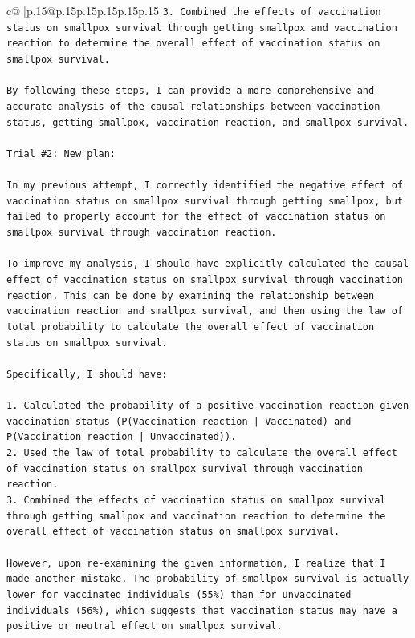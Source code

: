 \documentclass{article}
\begin{document}
{\begin{supertabular}{c@{$\;$}|p{.15\linewidth}@{}p{.15\linewidth}p{.15\linewidth}p{.15\linewidth}p{.15\linewidth}p{.15\linewidth}}
{{{\texttt{3. Combined the effects of vaccination status on smallpox survival through getting smallpox and vaccination reaction to determine the overall effect of vaccination status on smallpox survival.} \\
\\ 
\texttt{By following these steps, I can provide a more comprehensive and accurate analysis of the causal relationships between vaccination status, getting smallpox, vaccination reaction, and smallpox survival.} \\
\\ 
\texttt{Trial \#2: New plan: } \\
\\ 
\texttt{In my previous attempt, I correctly identified the negative effect of vaccination status on smallpox survival through getting smallpox, but failed to properly account for the effect of vaccination status on smallpox survival through vaccination reaction. } \\
\\ 
\texttt{To improve my analysis, I should have explicitly calculated the causal effect of vaccination status on smallpox survival through vaccination reaction. This can be done by examining the relationship between vaccination reaction and smallpox survival, and then using the law of total probability to calculate the overall effect of vaccination status on smallpox survival.} \\
\\ 
\texttt{Specifically, I should have:} \\
\\ 
\texttt{1. Calculated the probability of a positive vaccination reaction given vaccination status (P(Vaccination reaction | Vaccinated) and P(Vaccination reaction | Unvaccinated)).} \\
\texttt{2. Used the law of total probability to calculate the overall effect of vaccination status on smallpox survival through vaccination reaction.} \\
\texttt{3. Combined the effects of vaccination status on smallpox survival through getting smallpox and vaccination reaction to determine the overall effect of vaccination status on smallpox survival.} \\
\\ 
\texttt{However, upon re{-}examining the given information, I realize that I made another mistake. The probability of smallpox survival is actually lower for vaccinated individuals (55\%) than for unvaccinated individuals (56\%), which suggests that vaccination status may have a positive or neutral effect on smallpox survival.} \\
}}}
\end{supertabular}}
\end{document}
